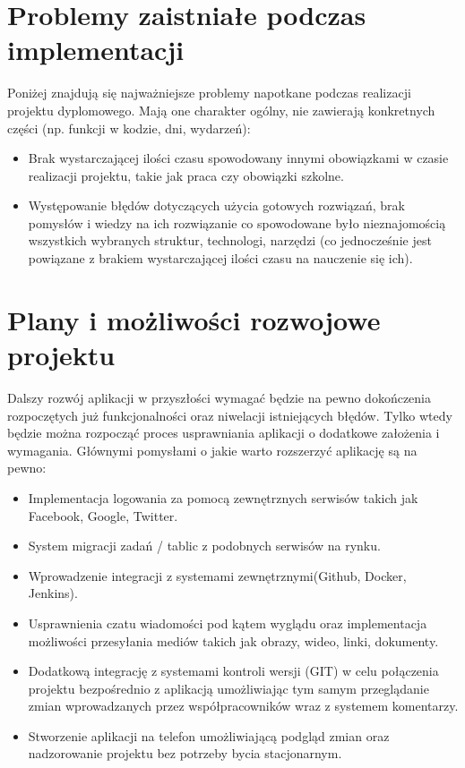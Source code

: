 \documentclass[eng,printmode]{mgr}
\begin{document}
\section{Problemy zaistniałe podczas implementacji}
Poniżej znajdują się najważniejsze problemy napotkane podczas realizacji projektu dyplomowego. Mają one charakter ogólny, nie zawierają konkretnych części (np. funkcji w kodzie, dni, wydarzeń):
\begin{itemize}
  \item Brak wystarczającej ilości czasu spowodowany innymi obowiązkami w czasie realizacji projektu, takie jak praca czy obowiązki szkolne.
  \item Występowanie błędów dotyczących użycia gotowych rozwiązań, brak pomysłów i wiedzy na ich rozwiązanie co spowodowane było nieznajomością wszystkich wybranych struktur, technologi, narzędzi (co jednocześnie jest powiązane z brakiem wystarczającej ilości czasu na nauczenie się ich).
\end{itemize}
\section{Plany i możliwości rozwojowe projektu}
Dalszy rozwój aplikacji w przyszłości wymagać będzie na pewno dokończenia rozpoczętych już funkcjonalności oraz niwelacji istniejących błędów. Tylko wtedy będzie można rozpocząć proces usprawniania aplikacji o dodatkowe założenia i wymagania. Głównymi pomysłami o jakie warto rozszerzyć aplikację są na pewno:
\begin{itemize}
  \item Implementacja logowania za pomocą zewnętrznych serwisów takich jak Facebook, Google, Twitter.
  \item System migracji zadań / tablic z podobnych serwisów na rynku.
  \item Wprowadzenie integracji z systemami zewnętrznymi(Github, Docker, Jenkins).
  \item Usprawnienia czatu wiadomości pod kątem wyglądu oraz implementacja możliwości przesyłania mediów takich jak obrazy, wideo, linki, dokumenty.
  \item Dodatkową integrację z systemami kontroli wersji (GIT) w celu połączenia projektu bezpośrednio z aplikacją umożliwiając tym samym przeglądanie zmian wprowadzanych przez współpracowników wraz z systemem komentarzy.
  \item Stworzenie aplikacji na telefon umożliwiającą podgląd zmian oraz nadzorowanie projektu bez potrzeby bycia stacjonarnym.
\end{itemize}


\begingroup
\raggedright

\endgroup
\end{document}
